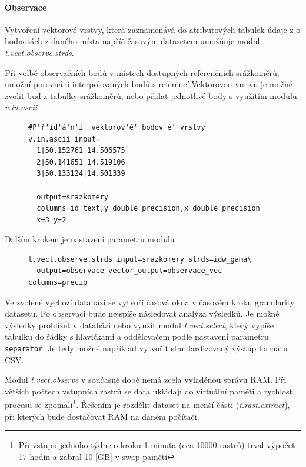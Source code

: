 \documentclass[a4paper,12pt,oneside]{report}
\begin{document}
\paragraph{Observace}
Vytvoření vektorové vrstvy, která zaznamenává do atributových tabulek údaje z o hodnotách z daného místa napříč časovým datasetem umožňuje modul \textit{t.vect.observe.strds}.

Při volbě observačních bodů v místech dostupných referenčních srážkoměrů, umožní porovnání interpolovaných bodů s referencí.Vektorovou vrstvu je možné zvolit buď z tabulky srážkoměrů, nebo přidat jednotlivé body s využitím modulu \textit{v.in.ascii}
\begin{figure}[h!]
\begin{footnotesize}
\lstset{extendedchars=false,
escapeinside=''}
\begin{lstlisting}[style=mybash]
#P'ř'id'á'n'í' vektorov'é' bodov'é' vrstvy
v.in.ascii input=
  1|50.152761|14.506575
  2|50.141651|14.519106
  3|50.133124|14.501339
  
  output=srazkomery 
  columns=id text,y double precision,x double precision 
  x=3 y=2
\end{lstlisting}
\end{footnotesize} 
\end{figure}

Dalším krokem je nastavení parametru modulu
\begin{figure}[h!]
\begin{footnotesize}
\lstset{extendedchars=false,
escapeinside=''}
\begin{lstlisting}[style=mybash]
t.vect.observe.strds input=srazkomery strds=idw_gama\
  output=observace vector_output=observace_vec columns=precip
\end{lstlisting}
\end{footnotesize} 
\end{figure}

Ve zvolené výchozí databázi se vytvoří časová okna v časovém kroku granularity datasetu.
Po observaci bude nejspíše následovat analýza výsledků. Je možné výsledky prohlížet v databázi nebo využít modul \textit{t.vect.select}, který vypíše tabulku do řádky s hlavičkami a oddělovačem podle nastavení parametru \texttt{separator}. Je tedy možné například vytvořit standardizovaný výstup formátu CSV.

Modul \textit{t.vect.observe} v současné době nemá zcela vyladěnou správu \acs{RAM}. Při větších počtech vstupních rastrů se data ukládají do virtuální paměti a rychlost procesu se zpomalí\footnote{Při vstupu jednoho týdne o kroku 1 minuta (cca 10000 rastrů) trval výpočet 17 hodin a zabral 10 [GB] v swap paměti }. Řešením je rozdělit dataset na menší části (\textit{t.rast.extract}), při kterých bude dostačovat \acs{RAM} na daném počítači.
\end{document}
